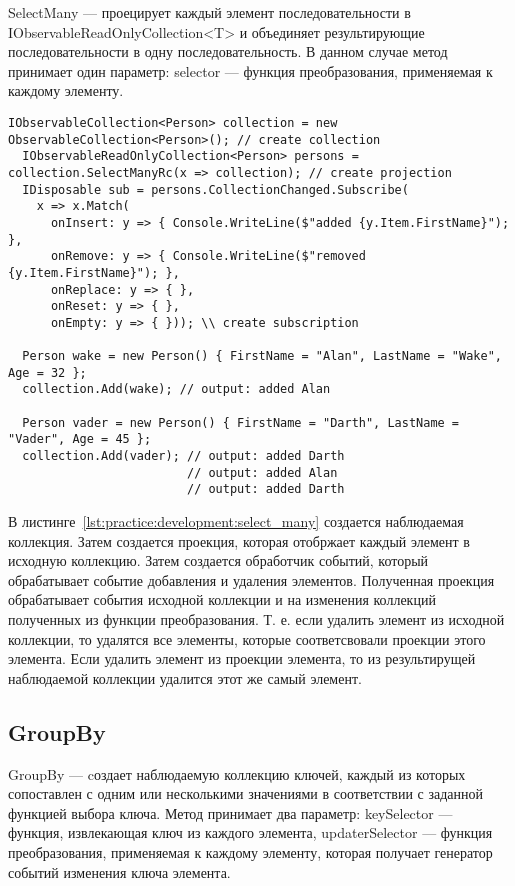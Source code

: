 SelectMany --- проецирует каждый элемент последовательности в IObservableReadOnlyCollection<T> и объединяет результирующие последовательности в одну последовательность.
В данном случае метод принимает один параметр: selector --- функция преобразования, применяемая к каждому элементу.

\begin{lstlisting}[style=csharpinlinestyle, caption={Пример использования SelectMany}, label=lst:practice:development:select_many]
  IObservableCollection<Person> collection = new ObservableCollection<Person>(); // create collection
  IObservableReadOnlyCollection<Person> persons = collection.SelectManyRc(x => collection); // create projection
  IDisposable sub = persons.CollectionChanged.Subscribe(
    x => x.Match(
      onInsert: y => { Console.WriteLine($"added {y.Item.FirstName}"); },
      onRemove: y => { Console.WriteLine($"removed {y.Item.FirstName}"); },
      onReplace: y => { },
      onReset: y => { },
      onEmpty: y => { })); \\ create subscription

  Person wake = new Person() { FirstName = "Alan", LastName = "Wake", Age = 32 };
  collection.Add(wake); // output: added Alan

  Person vader = new Person() { FirstName = "Darth", LastName = "Vader", Age = 45 };
  collection.Add(vader); // output: added Darth
                         // output: added Alan
                         // output: added Darth
\end{lstlisting}

В листинге~\ref{lst:practice:development:select_many} создается наблюдаемая коллекция. Затем создается проекция, которая отобржает каждый элемент в исходную коллекцию.
Затем создается обработчик событий, который обрабатывает событие добавления и удаления элементов.
Полученная проекция обрабатывает события исходной коллекции и на изменения коллекций полученных из функции преобразования.
Т. е. если удалить элемент из исходной коллекции, то удалятся все элементы, которые соответсвовали проекции этого элемента.
Если удалить элемент из проекции элемента, то из результирущей наблюдаемой коллекции удалится этот же самый элемент.

\subsection{GroupBy}
\label{sub:development:group_by}

GroupBy --- cоздает наблюдаемую коллекцию ключей, каждый из которых сопоставлен с одним или несколькими значениями в соответствии с заданной функцией выбора ключа.
Метод принимает два параметр: keySelector --- функция, извлекающая ключ из каждого элемента, updaterSelector --- функция преобразования,
применяемая к каждому элементу, которая получает генератор событий изменения ключа элемента.

